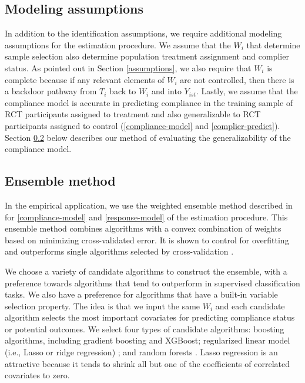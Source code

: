 \documentclass[hidelinks,12pt]{article}
\begin{document}
{{\subsection{Modeling assumptions}  \label{modeling-assumptions}
}
In addition to the identification assumptions, we require additional modeling assumptions for the estimation procedure. We assume that the $W_i$ that determine sample selection also determine population treatment assignment and complier status. As pointed out in Section \ref{assumptions}, we also require that $W_i$ is complete because if any relevant elements of $W_i$ are not controlled, then there is a backdoor pathway from $T_i$ back to $W_i$ and into $Y_{ist}$. Lastly, we assume that the compliance model is accurate in predicting compliance in the training sample of RCT participants assigned to treatment and also generalizable to RCT participants assigned to control (\ref{compliance-model} and \ref{complier-predict}). Section \ref{ensemble} below describes our method of evaluating the generalizability of the compliance model.

{\color{red}
\subsection{Ensemble method}  \label{ensemble}
}

In the empirical application, we use the weighted ensemble method described in \citet{van2007} for \ref{compliance-model} and \ref{response-model} of the estimation procedure. This ensemble method combines algorithms with a convex combination of weights based on minimizing cross-validated error. It is shown to control for overfitting and outperforms single algorithms selected by cross-validation \citep{polley2010super}. 

We choose a variety of candidate algorithms to construct the ensemble, with a preference towards algorithms that tend to outperform in supervised classification tasks. We also have a preference for algorithms that have a built-in variable selection property. The idea is that we input the same $W_i$ and each candidate algorithm selects the most important covariates for predicting compliance status or potential outcomes. We select four types of candidate algorithms: boosting algorithms, including gradient boosting \citep{friedman2001greedy, friedman2002stochastic} and XGBoost; regularized linear model (i.e., Lasso or ridge regression) \citep{tibshirani2012strong}; and random forests \citep{breiman2001}. Lasso regression is an attractive because it tends to shrink all but one of the coefficients of correlated covariates to zero. 

}
\end{document}
